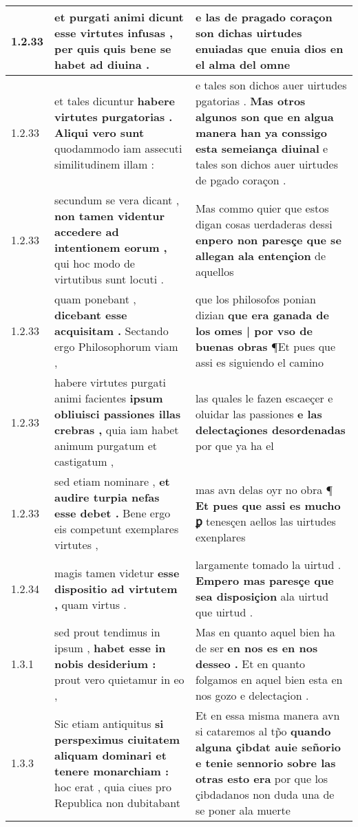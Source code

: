 \begin{tabular}{|p{1cm}|p{6.5cm}|p{6.5cm}|}
1.2.33 & et purgati animi dicunt \textbf{ esse virtutes infusas , } per quis quis bene se habet ad diuina . & e las de pragado coraçon \textbf{ son dichas uirtudes enuiadas } que enuia dios en el alma del omne \\\hline
1.2.33 & et tales dicuntur \textbf{ habere virtutes purgatorias . Aliqui vero sunt } quodammodo iam assecuti similitudinem illam : & e tales son dichos auer uirtudes pgatorias . \textbf{ Mas otros algunos son que en algua manera han ya conssigo esta semeiança diuinal } e tales son dichos auer uirtudes de pgado coraçon . \\\hline
1.2.33 & secundum se vera dicant , \textbf{ non tamen videntur accedere ad intentionem eorum , } qui hoc modo de virtutibus sunt locuti . & Mas commo quier que estos digan cosas uerdaderas dessi \textbf{ enpero non paresçe que se allegan ala entençion } de aquellos \\\hline
1.2.33 & quam ponebant , \textbf{ dicebant esse acquisitam . } Sectando ergo Philosophorum viam , & que los philosofos ponian dizian \textbf{ que era ganada de los omes | por vso de buenas obras } ¶Et pues que assi es siguiendo el camino \\\hline
1.2.33 & habere virtutes purgati animi facientes \textbf{ ipsum obliuisci passiones illas crebras , } quia iam habet animum purgatum et castigatum , & las quales le fazen escaeçer e oluidar las passiones \textbf{ e las delectaçiones desordenadas } por que ya ha el \\\hline
1.2.33 & sed etiam nominare , \textbf{ et audire turpia nefas esse debet . } Bene ergo eis competunt exemplares virtutes , & mas avn delas oyr no obra ¶ \textbf{ Et pues que assi es mucho ꝑ } tenesçen aellos las uirtudes exenplares \\\hline
1.2.34 & magis tamen videtur \textbf{ esse dispositio ad virtutem , } quam virtus . & largamente tomado la uirtud . \textbf{ Empero mas paresçe que sea disposiçion } ala uirtud que uirtud . \\\hline
1.3.1 & sed prout tendimus in ipsum , \textbf{ habet esse in nobis desiderium : } prout vero quietamur in eo , & Mas en quanto aquel bien ha de ser \textbf{ en nos es en nos desseo . } Et en quanto folgamos en aquel bien esta en nos gozo e delectaçion . \\\hline
1.3.3 & Sic etiam antiquitus \textbf{ si perspeximus ciuitatem aliquam dominari et tenere monarchiam : } hoc erat , quia ciues pro Republica non dubitabant & Et en essa misma manera avn si cataremos al tp̃o \textbf{ quando alguna çibdat auie señorio e tenie sennorio sobre las otras esto era } por que los çibdadanos non duda una de se poner ala muerte \\\hline

\end{tabular}
